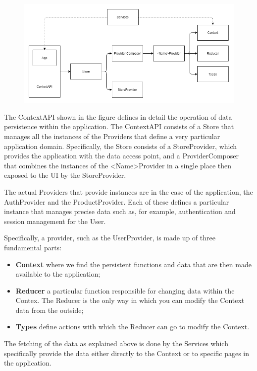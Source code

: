 \begin{figure}[H]
    \centering
    \includegraphics[width=45em]{res/images/frontend-diagrams/ContextAPI.png}
\end{figure}

The ContextAPI shown in the figure defines in detail the operation of data persistence within the application. The ContextAPI consists of a Store that manages all the instances of the Providers that define a very particular application domain. Specifically, the Store consists of a StoreProvider, which provides the application with the data access point, and a ProviderComposer that combines the instances of the <Name>Provider in a single place then exposed to the UI by the StoreProvider.

The actual Providers that provide instances are in the case of the application, the AuthProvider and the ProductProvider. Each of these defines a particular instance that manages precise data such as, for example, authentication and session management for the User.



Specifically, a provider, such as the UserProvider, is made up of three fundamental parts:

\begin{itemize}
    \item \textbf{Context} where we find the persistent functions and data that are then made available to the application;
    \item \textbf{Reducer} a particular function responsible for changing data within the Contex. The Reducer is the only way in which you can modify the Context data from the outside;
    \item \textbf{Types} define actions with which the Reducer can go to modify the Context.
\end{itemize}

The fetching of the data as explained above is done by the Services which specifically provide the data either directly to the Context or to specific pages in the application.

